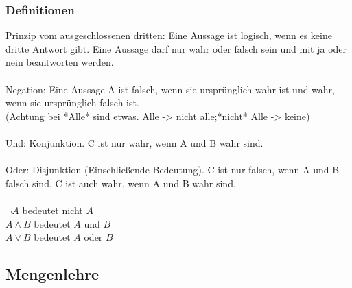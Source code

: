 \documentclass[11pt, a4paper]{article}
\begin{document}
\subsubsection{Definitionen}
Prinzip vom ausgeschlossenen dritten: Eine Aussage ist logisch, wenn es keine dritte Antwort gibt. Eine Aussage darf nur wahr oder falsch sein und mit ja oder nein beantworten werden.\\\\
Negation: Eine Aussage A ist falsch, wenn sie ursprünglich wahr ist und wahr, wenn sie ursprünglich falsch ist.\\(Achtung bei *Alle* sind etwas. Alle -> nicht alle;*nicht* Alle -> keine)\\\\
Und: Konjunktion. C ist nur wahr, wenn A und B wahr sind.\\\\
Oder: Disjunktion (Einschließende Bedeutung). C ist nur falsch, wenn A und B falsch sind. C ist auch wahr, wenn A und B wahr sind.\\\\
$\lnot A$ bedeutet nicht $A$\\
$A \land B$ bedeutet $A$ und $B$\\
$A \lor B$ bedeutet $A$ oder $B$


\subsection{Mengenlehre}
\end{document}
